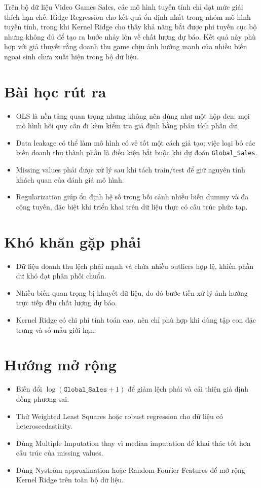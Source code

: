 \documentclass[12pt,a4paper]{article}
\begin{document}
Trên bộ dữ liệu Video Games Sales, các mô hình tuyến tính chỉ đạt mức giải thích hạn chế. Ridge Regression cho kết quả ổn định nhất trong nhóm mô hình tuyến tính, trong khi Kernel Ridge cho thấy khả năng bắt được phi tuyến cục bộ nhưng không đủ để tạo ra bước nhảy lớn về chất lượng dự báo. Kết quả này phù hợp với giả thuyết rằng doanh thu game chịu ảnh hưởng mạnh của nhiều biến ngoại sinh chưa xuất hiện trong bộ dữ liệu.

\section{Bài học rút ra}
\begin{itemize}
    \item OLS là nền tảng quan trọng nhưng không nên dùng như một hộp đen; mọi mô hình hồi quy cần đi kèm kiểm tra giả định bằng phân tích phần dư.
    \item Data leakage có thể làm mô hình có vẻ tốt một cách giả tạo; việc loại bỏ các biến doanh thu thành phần là điều kiện bắt buộc khi dự đoán \texttt{Global\_Sales}.
    \item Missing values phải được xử lý sau khi tách train/test để giữ nguyên tính khách quan của đánh giá mô hình.
    \item Regularization giúp ổn định hệ số trong bối cảnh nhiều biến dummy và đa cộng tuyến, đặc biệt khi triển khai trên dữ liệu thực có cấu trúc phức tạp.
\end{itemize}

\section{Khó khăn gặp phải}
\begin{itemize}
    \item Dữ liệu doanh thu lệch phải mạnh và chứa nhiều outliers hợp lệ, khiến phần dư khó đạt phân phối chuẩn.
    \item Nhiều biến quan trọng bị khuyết dữ liệu, do đó bước tiền xử lý ảnh hưởng trực tiếp đến chất lượng dự báo.
    \item Kernel Ridge có chi phí tính toán cao, nên chỉ phù hợp khi dùng tập con đặc trưng và số mẫu giới hạn.
\end{itemize}

\section{Hướng mở rộng}
\begin{itemize}
    \item Biến đổi $\log(\texttt{Global\_Sales}+1)$ để giảm lệch phải và cải thiện giả định đồng phương sai.
    \item Thử Weighted Least Squares hoặc robust regression cho dữ liệu có heteroscedasticity.
    \item Dùng Multiple Imputation thay vì median imputation để khai thác tốt hơn cấu trúc của missing values.
    \item Dùng Nyström approximation hoặc Random Fourier Features để mở rộng Kernel Ridge trên toàn bộ dữ liệu.
\end{itemize}
\end{document}
